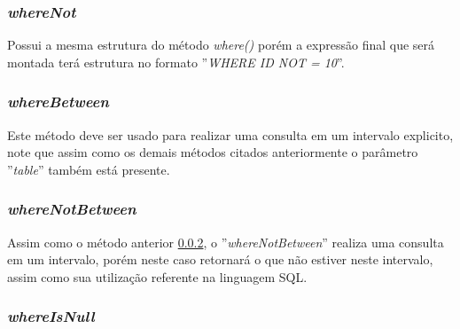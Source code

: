 \spaceH{}

\label{scripts/query_with_or_where.php}

\subsubsection{\textit{whereNot}}

Possui a mesma estrutura do método \textit{where()} porém a expressão final que será montada terá estrutura no formato ''\textit{WHERE ID NOT = 10}''.

\spaceH{}

\label{scripts/query_where_not.php}

\subsubsection{\textit{whereBetween}}
\label{whereBetween}

Este método deve ser usado para realizar uma consulta em um intervalo explicito, note que assim como os demais métodos citados anteriormente o parâmetro ''\textit{table}'' também está presente.

\spaceH{}

\label{scripts/query_with_where_between.php}

\subsubsection{\textit{whereNotBetween}}

Assim como o método anterior \ref{whereBetween}, o ''\textit{whereNotBetween}'' realiza uma consulta em um intervalo, porém neste caso retornará o que não estiver neste intervalo, assim como sua utilização referente na linguagem SQL.

\spaceH{}

\label{scripts/query_with_where_not_between.php}

\subsubsection{\textit{whereIsNull}}
\label{whereIsNull}

